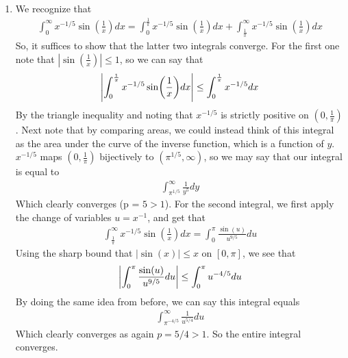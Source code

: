 \documentclass[12pt]{article}
\theoremstyle{definition}
\theoremstyle{remark}
\begin{document}
\begin{enumerate}[leftmargin=\labelsep]
		\item We recognize that 
		\begin{align*}
			\int_0^\infty x^{-1/5}\sin(\frac 1x)dx = \int_0^\frac 1\pi x^{-1/5}\sin(\frac 1x)dx+\int_\frac 1\pi ^\infty x^{-1/5}\sin(\frac 1x)dx
		\end{align*}
		So, it suffices to show that the latter two integrals converge. For the first one note that $|\sin(\frac 1x)| \leq 1$, so we can say that
		\begin{align*}
			\qty|\int_0^\frac 1\pi x^{-1/5}\sin(\frac 1x)dx| \leq \int_0^\frac 1\pi x^{-1/5}dx
		\end{align*}
		By the triangle inequality and noting that $x^{-1/5}$ is strictly positive on $(0, \frac 1\pi)$. Next note that by comparing areas, we could instead think of this integral as the area under the curve of the inverse function, which is a function of $y$. $x^{-1/5}$ maps $(0, \frac 1\pi)$ bijectively to $(\pi^{1/5}, \infty)$, so we may say that our integral is equal to
		\begin{align*}
			\int_{\pi^{1/5}} ^\infty \frac1{y^5}dy
		\end{align*}
		Which clearly converges (p = $5 > 1$). For the second integral, we first apply the change of variables $u = x^{-1}$, and get that
		\begin{align*}
			\int_\frac 1\pi ^\infty x^{-1/5}\sin(\frac 1x)dx = \int_0^\pi \frac{\sin(u)}{u^{9/5}}du
		\end{align*}
		Using the sharp bound that $|\sin(x)| \leq x$ on $[0, \pi]$, we see that
		\begin{align*}
			\qty |\int_0^\pi \frac{\sin(u)}{u^{9/5}}du| \leq \int_0^\pi u^{-4/5}du
		\end{align*}
		By doing the same idea from before, we can say this integral equals
		\begin{align*}
			\int_{\pi^{-4/5}}^\infty \frac{1}{u^{5/4}}du
		\end{align*}
		Which clearly converges as again $p = 5/4 > 1$. So the entire integral converges.
		

\end{enumerate}
\end{document}
